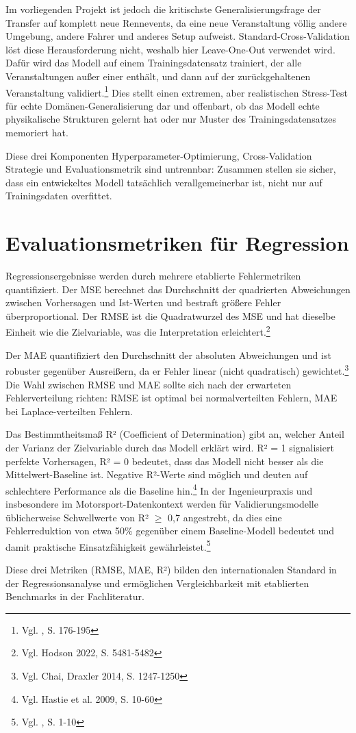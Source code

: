 Im vorliegenden Projekt ist jedoch die kritischste Generalisierungsfrage der Transfer auf komplett neue Rennevents, da eine neue Veranstaltung völlig andere Umgebung, andere Fahrer und anderes Setup aufweist. Standard-Cross-Validation löst diese Herausforderung nicht, weshalb hier Leave-One-Out verwendet wird. Dafür wird das Modell auf einem Trainingsdatensatz trainiert, der alle Veranstaltungen außer einer enthält, und dann auf der zurückgehaltenen Veranstaltung validiert.\footnote{Vgl. \cite{James2021}, S. 176-195} Dies stellt einen extremen, aber realistischen Stress-Test für echte Domänen-Generalisierung dar und offenbart, ob das Modell echte physikalische Strukturen gelernt hat oder nur Muster des Trainingsdatensatzes memoriert hat.

Diese drei Komponenten Hyperparameter-Optimierung, Cross-Validation Strategie und Evaluationsmetrik sind untrennbar: Zusammen stellen sie sicher, dass ein entwickeltes Modell tatsächlich verallgemeinerbar ist, nicht nur auf Trainingsdaten overfittet.


\section{Evaluationsmetriken für Regression}

Regressionsergebnisse werden durch mehrere etablierte Fehlermetriken quantifiziert. Der \ac{MSE} berechnet das Durchschnitt der quadrierten Abweichungen zwischen Vorhersagen und Ist-Werten und bestraft größere Fehler überproportional. Der \ac{RMSE} ist die Quadratwurzel des MSE und hat dieselbe Einheit wie die Zielvariable, was die Interpretation erleichtert.\footnote{Vgl. Hodson 2022, S. 5481-5482}

Der \ac{MAE} quantifiziert den Durchschnitt der absoluten Abweichungen und ist robuster gegenüber Ausreißern, da er Fehler linear (nicht quadratisch) gewichtet.\footnote{Vgl. Chai, Draxler 2014, S. 1247-1250} Die Wahl zwischen RMSE und MAE sollte sich nach der erwarteten Fehlerverteilung richten: RMSE ist optimal bei normalverteilten Fehlern, MAE bei Laplace-verteilten Fehlern.

Das Bestimmtheitsmaß R² (Coefficient of Determination) gibt an, welcher Anteil der Varianz der Zielvariable durch das Modell erklärt wird. R² = 1 signalisiert perfekte Vorhersagen, R² = 0 bedeutet, dass das Modell nicht besser als die Mittelwert-Baseline ist. Negative R²-Werte sind möglich und deuten auf schlechtere Performance als die Baseline hin.\footnote{Vgl. Hastie et al. 2009, S. 10-60} In der Ingenieurpraxis und insbesondere im Motorsport-Datenkontext werden für 
Validierungsmodelle üblicherweise Schwellwerte von R² $\geq$ 0,7 angestrebt, 
da dies eine Fehlerreduktion von etwa 50\% gegenüber einem Baseline-Modell 
bedeutet und damit praktische Einsatzfähigkeit gewährleistet.\footnote{Vgl. \cite{ODonnell2024}, S. 1-10}


Diese drei Metriken (RMSE, MAE, R²) bilden den internationalen Standard in der Regressionsanalyse und ermöglichen Vergleichbarkeit mit etablierten Benchmarks in der Fachliteratur.